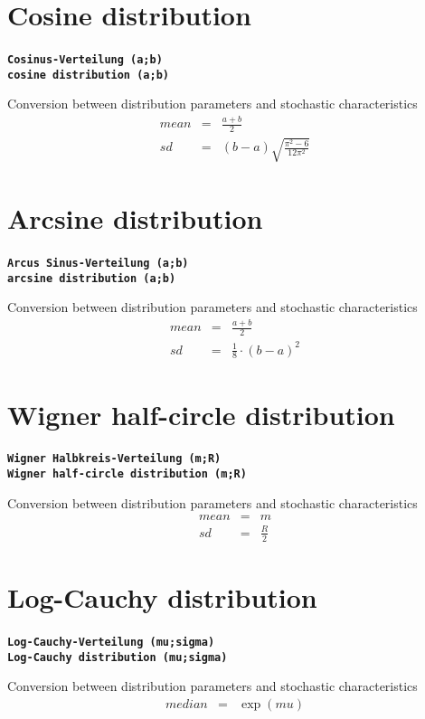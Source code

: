 \documentclass{svmono}
\def\cm#1{\textbf{\texttt{#1}}}
\begin{document}
\section*{Cosine distribution}
\cm{Cosinus-Verteilung (a;b)}~\\
\cm{cosine distribution (a;b)}

Conversion between distribution parameters and stochastic characteristics
\begin{eqnarray*}
mean&=&\frac{a+b}{2}\\
sd&=&(b-a)\sqrt{\frac{\pi^2-6}{12\pi^2}}
\end{eqnarray*}





\section*{Arcsine distribution}
\cm{Arcus Sinus-Verteilung (a;b)}~\\
\cm{arcsine distribution (a;b)}

Conversion between distribution parameters and stochastic characteristics
\begin{eqnarray*}
mean&=&\frac{a+b}{2}\\
sd&=&\frac{1}{8}\cdot(b-a)^2
\end{eqnarray*}




\section*{Wigner half-circle distribution}
\cm{Wigner Halbkreis-Verteilung (m;R)}~\\
\cm{Wigner half-circle distribution (m;R)}

Conversion between distribution parameters and stochastic characteristics
\begin{eqnarray*}
mean&=&m\\
sd&=&\frac{R}{2}
\end{eqnarray*}



\section*{Log-Cauchy distribution}
\cm{Log-Cauchy-Verteilung (mu;sigma)}~\\
\cm{Log-Cauchy distribution (mu;sigma)}

Conversion between distribution parameters and stochastic characteristics
\begin{eqnarray*}
median&=&\exp(mu)
\end{eqnarray*}
\end{document}

